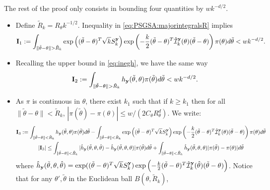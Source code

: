 \begin{proofb}
    The rest of the proof only consists in bounding  four  quantities by $ w k^{-d/2} $.
    \begin{itemize}
        \item Define $\tilde R_k=R_\theta k^{-1/2}$. %
        Inequality in \cref{eq:PSGSA:majorintegralsR} implies
        \begin{equation}
            \mbf I_1 := \int_{\|\tilde\theta-\theta\|>\tilde R_k} \exp\left((\tilde\theta-\theta)^T\sqrt{k}S_k^{\mbf y}\right)\exp\left( -\frac{k}{2}(\tilde\theta-\theta)^T\hat\cI_k^{\mbf y}(\theta)(\tilde\theta-\theta) \right)\pi(\theta)d\tilde\theta < w k^{-d/2}.
        \end{equation}
        \item Recalling the upper bound in \cref{eq:inegh}, we have the same way
            \begin{equation}
                \mbf I_2 := \int_{\|\tilde\theta-\theta\|>\tilde R_k} h_{\mbf y}(\tilde\theta,\theta)\pi(\tilde\theta)d\tilde\theta < w k^{-d/2}.
            \end{equation}
        \item  
        As $\pi$ is continuous in $\theta$, 
        there exist $k_1$ such that if $k\geq k_1$ then for all $\|\tilde\theta-\theta\|<\tilde R_k$, $|\pi(\tilde\theta)-\pi(\theta)|\leq w/(2C_\theta R_\theta^d)$. %
        We write:
            \begin{multline}\label{eq:continuityofHatIk}
               \mbf I_3 := \int_{\|\tilde\theta-\theta\|<\tilde R_k} h_{\mbf y}(\tilde\theta,\theta)\pi(\tilde\theta)d\tilde\theta  
                     - \int_{\|\tilde\theta-\theta\|<\tilde R_k}\exp\left((\tilde\theta-\theta)^T\sqrt{k}S_k^{\mbf y}\right)\exp\left(-\frac{k}{2}(\tilde\theta-\theta)^T\hat\cI_k^{\mbf y}(\theta)(\tilde\theta-\theta)\right)\pi(\theta)d\tilde\theta \\ %
                    |\mbf I_3| \leq \int_{\|\tilde\theta-\theta\|<\tilde R_k}|\hat h_{\mbf y}(\tilde\theta,\theta,\hat\theta) - \hat h_{\mbf y}(\tilde\theta,\theta,\theta) |\pi(\tilde\theta)d\tilde\theta + \int_{\|\tilde\theta-\theta\|<\tilde R_k}\hat h_{\mbf y}(\tilde\theta,\theta,\theta)|\pi(\tilde\theta)-\pi(\theta)|d\tilde\theta
            \end{multline}
        where $\hat h_{\mathbf{y}}(\tilde\theta,\theta,\hat\theta)=\exp((\tilde\theta-\theta)^T\sqrt{k}S_k^{\mathbf{y}})\exp\left(-\frac{k}{2}(\tilde\theta-\theta)^T\hat{\mathcal{I}}_k^{\mathbf{y}}(\hat\theta)(\tilde\theta-\theta)\right)$. {Notice that for any $\theta',\tilde\theta$ in the Euclidean ball $B(\theta,\tilde R_k)$,}

\end{itemize}
\end{proofb}
